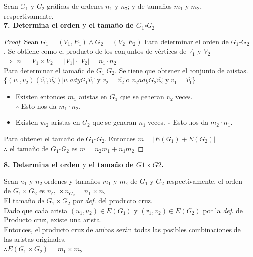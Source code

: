 \documentclass{article}
\begin{document}
  \begin{justify} %
  Sean $G_1$ y $G_2$ gráficas de ordenes $n_1$ y $n_2$; y de tamaños $m_1$ y $m_2$, respectivamente.\\
  \textbf{7. Determina el orden y el tamaño de $G_1 \square G_2$}
  \end{justify}
  \begin{proof}
    Sean $G_1 = (V_1, E_1) \land  G_2 = (V_2,E_2)$ 
    Para determinar el orden de $G_1 \square G_2$. Se obtiene como el producto de los conjuntos de vértices de $V_1$ y $V_2$. \\
    $\Longrightarrow$   $ n = \left| V_1 \times V_2 \right| = |V_1| \cdot |V_2| = n_1 \cdot n_2$ \\
    Para determinar el tamaño de $G_1 \square G_2$. Se tiene que obtener el conjunto de aristas.\\ \{$(v_1,v_2)(\hat{v_1}, \hat{v_2}) |
    v_1 adyG_1 \hat{v_1} $ y $ v_2 = \hat{v_2} $ o $ v_2 adyG_2 \hat{v_2} $ y $ v_1 = \hat{v_1}$\} \\
    \begin{itemize}
    \item Existen entonces $m_1$ aristas en $G_1$ que se generan $n_2$ veces.\\
      $\therefore $ Esto nos da  $m_1 \cdot n_2 $.\\
    \item Existen $m_2$ aristas en $G_2$ que se generan $n_1$ veces.
      $ \therefore $ Esto nos da $m_2 \cdot n_1$. \\
    \end{itemize}

    Para obtener el tamaño de $G_1 \square G_2$. Entonces $m = |E(G_1) + E(G_2)| $ \\
    $\therefore$ el tamaño de $G_1 \square G_2$ es $m = n_2m_1 + n_1m_2 $
  \end{proof}
  \textbf{8. Determina el orden y el tamaño de $G1 \times G2$.} \\
  \begin{justify}
    Sean $n_1$ y $n_2$ ordenes y tamaños $m_1$ y $ m_2$ de $G_1$ y $G_2$  respectivamente,
    el orden de $G_1 \times  G_2 $ es $n_{G_1} \times n_{G_2} = n_1 \times n_2$ \\
    El tamaño de $G_1 \times G_2 $ por \textit{def.} del producto cruz. \\
    Dado que cada arista $(u_1,u_2) \in E(G_1) $ y  $(v_1,v_2) \in E(G_2) $ por la \textit{def.} de Producto cruz, existe una arista. \\
    Entonces, el producto cruz de ambas serán todas las posibles combinaciones de las aristas originales. \\
    $\therefore E(G_1 \times G_2) = m_1 \times m_2$ 
  \end{justify}
    
\end{document}
